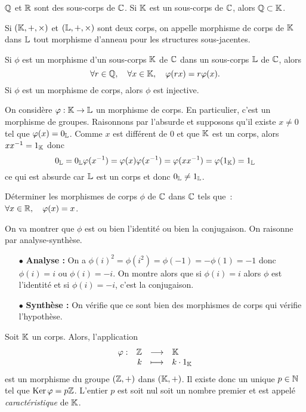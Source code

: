 \documentclass{magnolia}
\begin{document}
\begin{remarqueUnique}
\remarque $\mathbb{Q}$ et $\mathbb{R}$ sont des sous-corps de $\mathbb{C}$.
\remarque Si $\mathbb{K}$ est un sous-corps de $\mathbb{C}$, alors $\mathbb{Q}\subset \mathbb{K}$.    
\end{remarqueUnique}

\begin{definition}
Si $\left(\mathbb{K},+,\times\right)$ et $\left(\mathbb{L},+,\times\right)$ sont deux corps, on appelle morphisme
de corps de $\mathbb{K}$ dans $\mathbb{L}$ tout morphisme d'anneau pour les structures
sous-jacentes.
\end{definition}

\begin{remarques}
\remarque Si $\phi$ est un morphisme d'un sous-corps $\mathbb{K}$ de $\mathbb{C}$ dans un sous-corps
  $\mathbb{L}$ de $\mathbb{C}$, alors
  \[\forall r\in\mathbb{Q},\quad \forall x\in\mathbb{K},\quad \varphi(rx)=r\varphi(x).\]
\remarque Si $\phi$ est un morphisme de corps, alors $\phi$ est injective.
\end{remarques}
\begin{sol}
On considère $\varphi:\mathbb{K}\to \mathbb{L}$ un morphisme de corps. En particulier, c'est un morphisme de groupes. Raisonnons par l'absurde et supposons qu'il existe $x\neq 0$ tel que $\varphi(x)=0_{\mathbb{L}}$. Comme $x$ est différent de $0$ et que $\mathbb{K}$ est un corps, alors $xx^{-1}=1_{\mathbb{K}}$ donc $$0_{\mathbb{L}}=0_{\mathbb{L}}\varphi(x^{-1})=\varphi(x)\varphi(x^{-1})=\varphi(xx^{-1})=\varphi(1_{\mathbb{K}})=1_{\mathbb{L}}$$ ce qui est absurde car $\mathbb{L}$ est un corps et donc $0_{\mathbb{L}}\neq 1_{\mathbb{L}}$.
\end{sol}


\begin{exoUnique}
\exo Déterminer les morphismes de corps $\phi$ de $\mathbb{C}$ dans $\mathbb{C}$ tels
  que~: $\forall x\in\mathbb{R} ,\quad \varphi(x)=x$.
\end{exoUnique}

\begin{sol}
On va montrer que $\phi$ est ou bien l'identité ou bien la conjugaison. On raisonne par analyse-synthèse.
\begin{itemize}
\item[$\bullet$] \textbf{Analyse :} On a $\phi(i)^2=\phi(i^2)=\phi(-1)=-\phi(1)=-1$ donc $\phi(i)=i$ ou $\phi(i)=-i$. On montre alors que si $\phi(i)=i$ alors $\phi$ est l'identité et si $\phi(i)=-i$, c'est la conjugaison.
\item[$\bullet$] \textbf{Synthèse :} On vérifie que ce sont bien des morphismes de corps qui vérifie l'hypothèse.
\end{itemize}
\end{sol}

\begin{definition}
Soit $\mathbb{K}$ un corps. Alors, l'application
\[\begin{array}[t]{lrcl} \displaystyle{\varphi} : & \displaystyle{\mathbb{Z}} & \longrightarrow & \displaystyle{\ensuremath{\mathbb{K}}} \\ & \displaystyle{k} & \longmapsto & \displaystyle{k\cdot 1_{\ensuremath{\mathbb{K}}}} \end{array}\]
est un morphisme du groupe $(\mathbb{Z},+)$ dans $(\mathbb{K},+)$. Il existe donc un unique $p\in\mathbb{N}$ tel que $\mathop{\rm Ker}\varphi=p\mathbb{Z}$.
L'entier $p$ est soit nul soit un nombre premier et est appelé \emph{caractéristique} de $\mathbb{K}$.
\end{definition}
\end{document}
